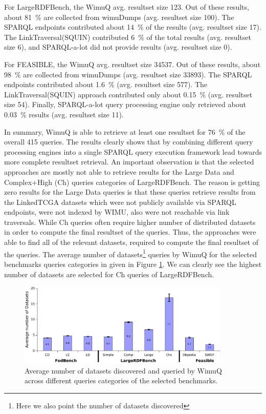 \documentclass[sw]{iosart2x}
\begin{document}
For LargeRDFBench, the WimuQ avg. resultset size 123. Out of these results, about \SI{81}{\percent} are collected from wimuDumps (avg. resultset size 100). The SPARQL endpoints contributed about \SI{14}{\percent} of the results (avg. resultset size 17). The LinkTraversal(SQUIN) contributed \SI{6}{\percent} of the total results (avg. resultset size 6), and SPARQL-a-lot did not provide results (avg. resultset size 0). 

For FEASIBLE, the WimuQ avg. resultset size \num{34537}. Out of these results, about \SI{98}{\percent} are collected from wimuDumps (avg. resultset size \num{33893}). The SPARQL endpoints contributed about \SI{1.6}{\percent} (avg. resultset size 577). The LinkTraversal(SQUIN) approach contributed only about \SI{0.15}{\percent} (avg. resultset size 54). Finally, SPARQL-a-lot query processing engine only retrieved about \SI{0.03}{\percent} results (avg. resultset size 11). 

In summary, WimuQ is able to retrieve at least one resultset for \SI{76}{\percent} of the overall 415 queries. The results clearly shows that by combining different query processing engines into a single SPARQL query execution framework lead towards more complete resultset retrieval. 
An important observation is that the selected approaches are mostly not able to retrieve results for the Large Data and Complex+High (Ch) queries categories of LargeRDFBench. The reason is getting zero results for the Large Data queries is that these queries retrieve results from the LinkedTCGA \cite{tcga2013} datasets which were not publicly available via SPARQL endpoints, were not indexed by WIMU, also were not reachable via link traversals. While Ch queries often require higher number of distributed datasets in order to compute the final resultset of the queries. Thus, the approaches were able to find all of the relevant datasets, required to compute the final resultset of the queries. The average number of datasets\footnote{Here we also point the number of datasets discovered} queries by WimuQ for the selected benchmarks queries categories in given in Figure \ref{fig:numberDatasets1}. We can clearly see the highest number of datasets are selected for Ch queries of LargeRDFBench. 

\begin{figure}[htb]
\centering
    \includegraphics[width=0.9\textwidth]{img/numberDatasets1.pdf}
	\caption{Average number of datasets discovered and queried by WimuQ across different queries categories of the selected benchmarks.}
	\label{fig:numberDatasets1}
\end{figure}
\end{document}
